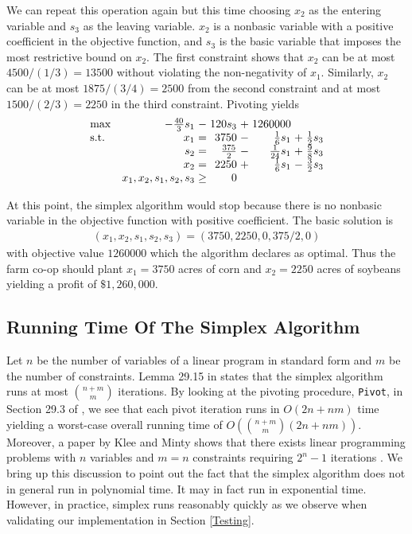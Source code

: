 \documentclass{article}
\newcommand{\javaCode}[1]{\texttt{#1}}
\begin{document}
We can repeat this operation again but this time choosing $x_2$ as the entering variable and $s_3$ as the leaving variable. $x_2$ is a nonbasic variable with a positive coefficient in the objective function, and $s_3$ is the basic variable that imposes the most restrictive bound on $x_2$. The first constraint shows that $x_2$ can be at most $4500 / (1/3) = 13500$ without violating the non-negativity of $x_1$. Similarly, $x_2$ can be at most $1875 / (3/4) = 2500$ from the second constraint and at most $1500 / (2/3) = 2250$ in the third constraint. Pivoting yields
\begin{equation*}
\setlength\arraycolsep{1.5pt}
  \begin{array}{l@{\quad} r c r c r c r}
    \max          & -\frac{40}{3}s_1 & - &         120 s_3 &    +  & 1260000    \\
    \mathrm{s.t.} & x_1 & = & 3750 & - & \frac{1}{6} s_1 & + & \frac{1}{2}s_3 \\
    & s_2 & = & \frac{375}{2} & - & \frac{1}{24}s_1 & + & \frac{9}{8} s_3 \\
    & x_2 & = & 2250 & + & \frac{1}{6}s_1 & - & \frac{3}{2}s_3 \\
    & x_1, x_2, s_1, s_2, s_3 & \geq & 0 &&&&  \\
  \end{array}
\end{equation*}

At this point, the simplex algorithm would stop because there is no nonbasic variable in the objective function with positive coefficient. The basic solution is
\begin{align*}
    (x_1, x_2, s_1, s_2, s_3) = (3750, 2250, 0, 375/2, 0)
\end{align*}
with objective value $1260000$ which the algorithm declares as optimal. Thus the farm co-op should plant $x_1 = 3750$ acres of corn and $x_2 = 2250$ acres of soybeans yielding a profit of $\$1,260,000$.

\subsection{Running Time Of The Simplex Algorithm}
Let $n$ be the number of variables of a linear program in standard form and $m$ be the number of constraints. Lemma 29.15 in \cite{CLRS} states that the simplex algorithm runs at most $\binom{n+m}{m}$ iterations. By looking at the pivoting procedure, \javaCode{Pivot}, in Section 29.3 of \cite{CLRS}, we see that each pivot iteration runs in $O(2n + nm)$ time yielding a worst-case overall running time of $O\left(\binom{n+m}{m}(2n + nm)\right)$. Moreover, a paper by Klee and Minty shows that there exists linear programming problems with $n$ variables and $m=n$ constraints requiring $2^n - 1$ iterations \cite{klee1972good}. We bring up this discussion to point out the fact that the simplex algorithm does not in general run in polynomial time. It may in fact run in exponential time. However, in practice, simplex runs reasonably quickly as we observe when validating our implementation in Section \ref{Testing}.
\end{document}
